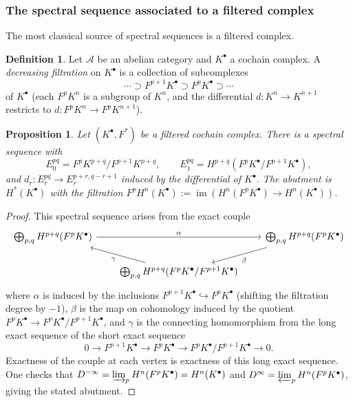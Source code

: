 \documentclass[12pt,a4paper]{article}
\newtheorem{proposition}[theorem]{Proposition}
\theoremstyle{definition}
\newtheorem{definition}[theorem]{Definition}
\begin{document}
\subsubsection{The spectral sequence associated to a filtered complex}
\label{subsubsec:filtered-complex-SS}

The most classical source of spectral sequences is a filtered complex.

\begin{definition}\label{def:filtered-complex}
Let $\mathcal{A}$ be an abelian category and $K^\bullet$ a cochain complex.
A \emph{decreasing filtration} on $K^\bullet$ is a collection of subcomplexes
\[
  \cdots\supset F^{p+1}K^\bullet\supset F^pK^\bullet\supset\cdots
\]
of $K^\bullet$ (each $F^pK^n$ is a subgroup of $K^n$, and the differential
$d:K^n\to K^{n+1}$ restricts to $d:F^pK^n\to F^pK^{n+1}$).
\end{definition}

\begin{proposition}\label{prop:filtered-complex-SS}
Let $(K^\bullet,F^*)$ be a filtered cochain complex.  There is a spectral sequence
with
\[
  E_0^{pq} = F^pK^{p+q}/F^{p+1}K^{p+q},\qquad
  E_1^{pq} = H^{p+q}(F^pK^\bullet/F^{p+1}K^\bullet),
\]
and $d_r:E_r^{pq}\to E_r^{p+r,q-r+1}$ induced by the differential of $K^\bullet$.
The abutment is $H^*(K^\bullet)$ with the filtration
$F^pH^n(K^\bullet):=\operatorname{im}(H^n(F^pK^\bullet)\to H^n(K^\bullet))$.
\end{proposition}
\begin{proof}
This spectral sequence arises from the exact couple
\[
\begin{tikzcd}[column sep=2em, row sep=1.6em]
  \bigoplus_{p,q}H^{p+q}(F^pK^\bullet) \ar[rr,"\alpha"] &&
  \bigoplus_{p,q}H^{p+q}(F^pK^\bullet) \ar[dl,"\beta"] \\
  & \bigoplus_{p,q}H^{p+q}(F^pK^\bullet/F^{p+1}K^\bullet) \ar[ul,"\gamma"] &
\end{tikzcd}
\]
where $\alpha$ is induced by the inclusions $F^{p+1}K^\bullet\hookrightarrow
F^pK^\bullet$ (shifting the filtration degree by $-1$), $\beta$ is the map on
cohomology induced by the quotient $F^pK^\bullet\to F^pK^\bullet/F^{p+1}K^\bullet$,
and $\gamma$ is the connecting homomorphism from the long exact sequence of
the short exact sequence
\[
  0\longrightarrow F^{p+1}K^\bullet\longrightarrow F^pK^\bullet
  \longrightarrow F^pK^\bullet/F^{p+1}K^\bullet\longrightarrow 0.
\]
Exactness of the couple at each vertex is exactness of this long exact sequence.
One checks that $D^{-\infty}=\varinjlim_p H^n(F^pK^\bullet)=H^n(K^\bullet)$ and
$D^\infty=\varprojlim_p H^n(F^pK^\bullet)$, giving the stated abutment.
\end{proof}
\end{document}
